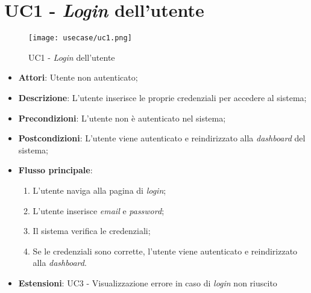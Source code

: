 \section*{UC1 - \textit{Login} dell'utente}

\begin{figure}[H]
    \centering
    \texttt{[image: usecase/uc1.png]}
    \caption{UC1 - \textit{Login} dell'utente}
    \label{fig:uc1}
\end{figure}
\begin{itemize}
    \item \textbf{Attori}: Utente non autenticato;
    \item \textbf{Descrizione}: L'utente inserisce le proprie credenziali per accedere al sistema;
    \item \textbf{Precondizioni}: L'utente non è autenticato nel sistema;
    \item \textbf{Postcondizioni}: L'utente viene autenticato e reindirizzato alla \textit{dashboard} del sistema;
    \item \textbf{Flusso principale}:
    \begin{enumerate}
        \item L'utente naviga alla pagina di \textit{login};
        \item L'utente inserisce \textit{email} e \textit{password};
        \item Il sistema verifica le credenziali;
        \item Se le credenziali sono corrette, l'utente viene autenticato e reindirizzato alla \textit{dashboard}.
    \end{enumerate}
    \item \textbf{Estensioni}: UC3 - Visualizzazione errore in caso di \textit{login} non riuscito
\end{itemize}

\vspace{0.5cm}
